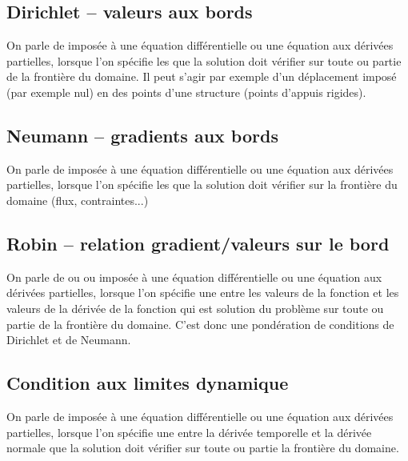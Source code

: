 \medskip
\subsection{Dirichlet -- valeurs aux bords}
\medskipvm
On parle de  imposée à une équation différentielle ou une équation aux dérivées partielles, lorsque l'on spécifie les  que la solution doit vérifier sur toute ou partie de la frontière du domaine.
\medskipvm
Il peut s'agir par exemple d'un déplacement imposé (par exemple nul) en des points d'une structure (points d'appuis rigides).

\medskip
\subsection{Neumann -- gradients aux bords}

On parle de  imposée à une équation différentielle ou une équation aux dérivées partielles, lorsque l'on spécifie les  que la solution doit vérifier sur la frontière du domaine (flux, contraintes...)

\medskip
\subsection{Robin -- relation gradient/valeurs sur le bord}

On parle de  ou  ou  imposée à une équation différentielle ou une équation aux dérivées partielles, lorsque l'on spécifie une  entre les valeurs de la fonction et les valeurs de la dérivée de la fonction qui est solution du problème sur toute ou partie de la frontière du domaine.
\medskipvm
C'est donc une pondération de conditions de Dirichlet et de Neumann.

\medskip
\subsection{Condition aux limites dynamique}
On parle de  imposée à une équation différentielle ou une équation aux dérivées partielles, lorsque l'on spécifie une  entre la dérivée temporelle et la dérivée normale que la solution doit vérifier sur toute ou partie la frontière du domaine.

